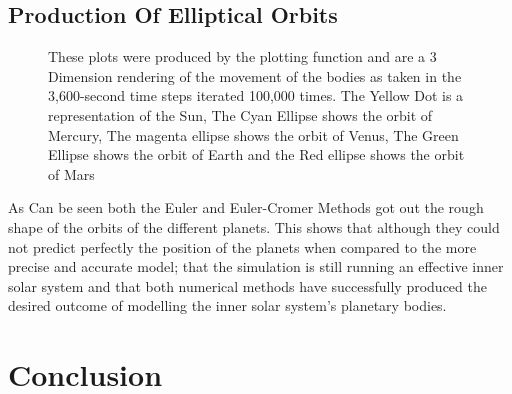 \documentclass[a4paper,10pt]{article}
\begin{document}
\subsection{Production Of Elliptical Orbits}
 \begin{figure}[htb!]
        \caption{These plots were produced by the plotting function and are a 3 Dimension rendering of the movement of the bodies as taken in the 3,600-second time steps iterated 100,000 times. The Yellow Dot is a representation of the Sun, The Cyan Ellipse shows the orbit of Mercury, The magenta ellipse shows the orbit of Venus, The Green Ellipse shows the orbit of Earth and the Red ellipse shows the orbit of Mars}
        \label{plot:orbits}
     \end{figure}
 
 As Can be seen both the Euler and Euler-Cromer Methods got out the rough shape of the orbits of the different planets. This shows that although they could not predict perfectly the position of the planets when compared to the more precise and accurate model; that the simulation is still running an effective inner solar system and that both numerical methods have successfully produced the desired outcome of modelling the inner solar system's planetary bodies.



\newpage

\section{Conclusion}
\end{document}
